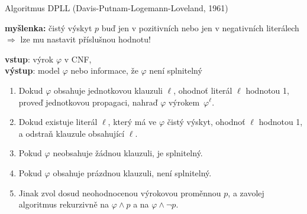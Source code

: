 \documentclass{beamer}
\begin{document}
\begin{frame}{Algoritmus DPLL (Davis-Putnam-Logemann-Loveland, 1961)}

    \textbf{myšlenka:} \alert{čistý výskyt} $p$  buď jen v pozitivních nebo jen v negativních literálech $\Rightarrow$ lze mu nastavit příslušnou hodnotu!

    \pause
    \pause
    \textbf{vstup}: výrok $\varphi$ v CNF,\\ 
    \textbf{výstup}: model $\varphi$ nebo informace, že  $\varphi$ není splnitelný
    \pause
    \begin{enumerate}[<+->]                
        \item Dokud $\varphi$ obsahuje jednotkovou klauzuli $\ell$, ohodnoť literál $\ell$ hodnotou 1, proveď \alert{jednotkovou propagaci}, nahraď $\varphi$ výrokem~$\varphi^\ell$.
         \item Dokud existuje literál $\ell$, který má ve $\varphi$ \alert{čistý výskyt}, ohodnoť $\ell$ hodnotou 1, a odstraň klauzule obsahující $\ell$.
        \item Pokud $\varphi$ neobsahuje žádnou klauzuli, je splnitelný.
        \item Pokud $\varphi$ obsahuje prázdnou klauzuli, není splnitelný.
        \item Jinak zvol dosud neohodnocenou výrokovou proměnnou $p$, a \alert{zavolej algoritmus rekurzivně} na $\varphi\land p$ a na $\varphi\land \neg p$.
    \end{enumerate}

\end{frame}
\end{document}
